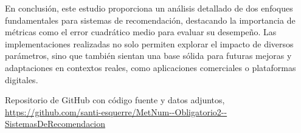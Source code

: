 \documentclass[12pt,a4paper]{article}
\begin{document}
En conclusión, este estudio proporciona un análisis detallado de dos enfoques fundamentales para sistemas de recomendación, destacando la importancia de métricas como el error cuadrático medio para evaluar su desempeño. Las implementaciones realizadas no solo permiten explorar el impacto de diversos parámetros, sino que también sientan una base sólida para futuras mejoras y adaptaciones en contextos reales, como aplicaciones comerciales o plataformas digitales.


\begin{thebibliography}{9} %
  
   Repositorio de GitHub con código fuente y datos adjuntos, \url{https://github.com/santi-esquerre/MetNum--Obligatorio2--SistemasDeRecomendacion}
  
\end{thebibliography}
\end{document}

